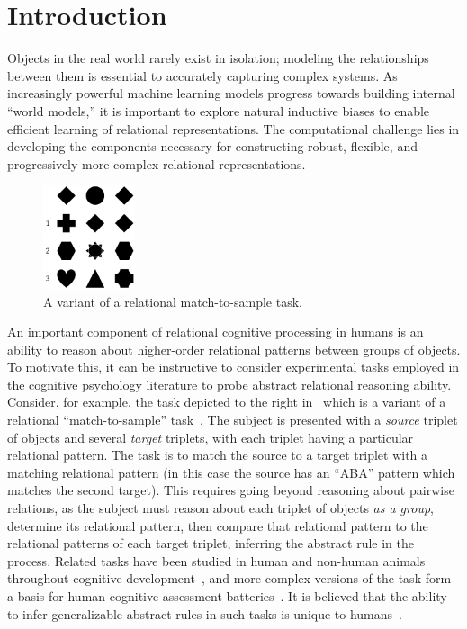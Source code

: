 \section{Introduction}\label{sec:intro}

Objects in the real world rarely exist in isolation; 
modeling the relationships between them is essential to accurately capturing complex systems. As increasingly powerful machine learning models progress towards building internal ``world models,'' it is important to explore natural inductive biases to enable efficient learning of relational representations. The computational challenge lies in developing the components necessary for constructing robust, flexible, and progressively more complex relational representations.

\begin{figure}
    \vskip-10pt
    \includegraphics[width=0.24\textwidth]{figs/triplet_rmts_fig.pdf}
    \caption{A variant of a relational match-to-sample task.}\label{fig:rmts_example}
    \vskip-10pt
\end{figure}
An important component of relational cognitive processing in humans is an ability to reason about higher-order relational patterns between groups of objects. To motivate this, it can be instructive to consider experimental tasks employed in the cognitive psychology literature to probe abstract relational reasoning ability. Consider, for example, the task depicted to the right in~ which is a variant of a relational ``match-to-sample'' task~\citep{ferster1960intermittent, webbEmergentSymbols2021}. The subject is presented with a \textit{source} triplet of objects and several \textit{target} triplets, with each triplet having a particular relational pattern. The task is to match the source to a target triplet with a matching relational pattern (in this case the source has an ``ABA'' pattern which matches the second target).
This requires going beyond reasoning about pairwise relations, as the subject must reason about each triplet of objects \textit{as a group}, determine its relational pattern, then compare that relational pattern to the relational patterns of each target triplet, inferring the abstract rule in the process. Related tasks have been studied in human and non-human animals throughout cognitive development~\citep{carpenter1990one,marcus1999rule,Hochmann2017ChildrensRO}, and more complex versions of the task form a basis for human cognitive assessment batteries~\citep{englund1987unified}. It is believed that the ability to infer generalizable abstract rules in such tasks is unique to humans~\citep{fagot2001discriminating}.

